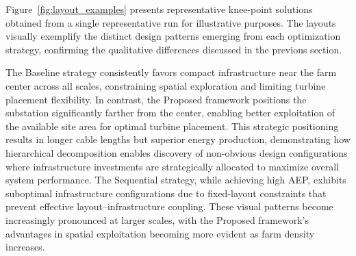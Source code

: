 \documentclass[format=sigconf,anonymous=true,review=true]{acmart}
\begin{document}
Figure~\ref{fig:layout_examples} presents representative knee-point solutions obtained from a single representative run for illustrative purposes. The layouts visually exemplify the distinct design patterns emerging from each optimization strategy, confirming the qualitative differences discussed in the previous section.

The Baseline strategy consistently favors compact infrastructure near the farm center across all scales, constraining spatial exploration and limiting turbine placement flexibility. In contrast, the Proposed framework positions the substation significantly farther from the center, enabling better exploitation of the available site area for optimal turbine placement. This strategic positioning results in longer cable lengths but superior energy production, demonstrating how hierarchical decomposition enables discovery of non-obvious design configurations where infrastructure investments are strategically allocated to maximize overall system performance. The Sequential strategy, while achieving high AEP, exhibits suboptimal infrastructure configurations due to fixed-layout constraints that prevent effective layout--infrastructure coupling. These visual patterns become increasingly pronounced at larger scales, with the Proposed framework's advantages in spatial exploitation becoming more evident as farm density increases.
\end{document}
